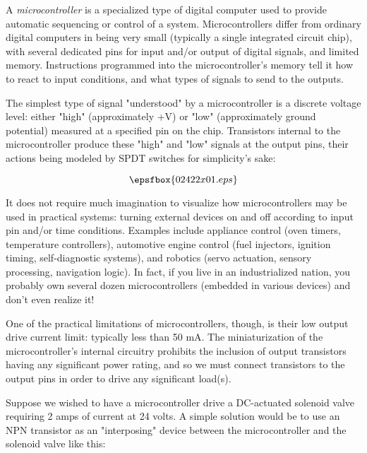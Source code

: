 

A {\it microcontroller} is a specialized type of digital computer used to provide automatic sequencing or control of a system.  Microcontrollers differ from ordinary digital computers in being very small (typically a single integrated circuit chip), with several dedicated pins for input and/or output of digital signals, and limited memory.  Instructions programmed into the microcontroller's memory tell it how to react to input conditions, and what types of signals to send to the outputs.

The simplest type of signal "understood" by a microcontroller is a discrete voltage level: either "high" (approximately +V) or "low" (approximately ground potential) measured at a specified pin on the chip.  Transistors internal to the microcontroller produce these "high" and "low" signals at the output pins, their actions being modeled by SPDT switches for simplicity's sake:

$$\epsfbox{02422x01.eps}$$

It does not require much imagination to visualize how microcontrollers may be used in practical systems: turning external devices on and off according to input pin and/or time conditions.  Examples include appliance control (oven timers, temperature controllers), automotive engine control (fuel injectors, ignition timing, self-diagnostic systems), and robotics (servo actuation, sensory processing, navigation logic).  In fact, if you live in an industrialized nation, you probably own several dozen microcontrollers (embedded in various devices) and don't even realize it!

One of the practical limitations of microcontrollers, though, is their low output drive current limit: typically less than 50 mA.  The miniaturization of the microcontroller's internal circuitry prohibits the inclusion of output transistors having any significant power rating, and so we must connect transistors to the output pins in order to drive any significant load(s).

Suppose we wished to have a microcontroller drive a DC-actuated solenoid valve requiring 2 amps of current at 24 volts.  A simple solution would be to use an NPN transistor as an "interposing" device between the microcontroller and the solenoid valve like this:

